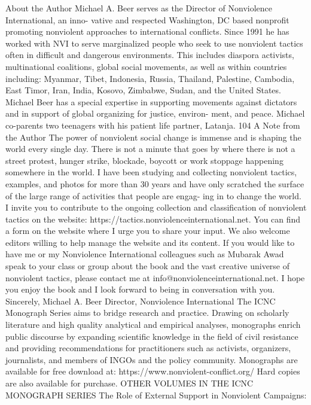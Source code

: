 \documentclass[twoside,a4paper,12pt,fleqn,openany]{extbook}
\begin{document}
About the Author
Michael A. Beer serves as the Director of Nonviolence International, an inno-
vative and respected Washington, DC based nonprofit promoting nonviolent
approaches to international conflicts. Since 1991 he has worked with NVI to
serve marginalized people who seek to use nonviolent tactics often in difficult
and dangerous environments. This includes diaspora activists, multinational
coalitions, global social movements, as well as within countries including:
Myanmar, Tibet, Indonesia, Russia, Thailand, Palestine, Cambodia, East Timor,
Iran, India, Kosovo, Zimbabwe, Sudan, and the United States. Michael Beer has a special expertise
in supporting movements against dictators and in support of global organizing for justice, environ-
ment, and peace. Michael co-parents two teenagers with his patient life partner, Latanja.
104
A Note from the Author
The power of nonviolent social change is immense and is shaping the world every single
day. There is not a minute that goes by where there is not a street protest, hunger strike,
blockade, boycott or work stoppage happening somewhere in the world. I have been
studying and collecting nonviolent tactics, examples, and photos for more than 30 years
and have only scratched the surface of the large range of activities that people are engag-
ing in to change the world.
I invite you to contribute to the ongoing collection and classification of nonviolent tactics
on the website: https://tactics.nonviolenceinternational.net. You can find a form on the
website where I urge you to share your input. We also welcome editors willing to help
manage the website and its content.
If you would like to have me or my Nonviolence International colleagues such as Mubarak
Awad speak to your class or group about the book and the vast creative universe of
nonviolent tactics, please contact me at info@nonviolenceinternational.net.
I hope you enjoy the book and I look forward to being in conversation with you.
Sincerely,
Michael A. Beer
Director, Nonviolence International
The ICNC Monograph Series aims to bridge research and practice. Drawing on
scholarly literature and high quality analytical and empirical analyses, monographs
enrich public discourse by expanding scientific knowledge in the field of civil
resistance and providing recommendations for practitioners such as activists,
organizers, journalists, and members of INGOs and the policy community.
Monographs are available for free download at:
https://www.nonviolent-conflict.org/
Hard copies are also available for purchase.
OTHER VOLUMES IN THE ICNC MONOGRAPH SERIES
The Role of External Support in Nonviolent Campaigns:
\end{document}
